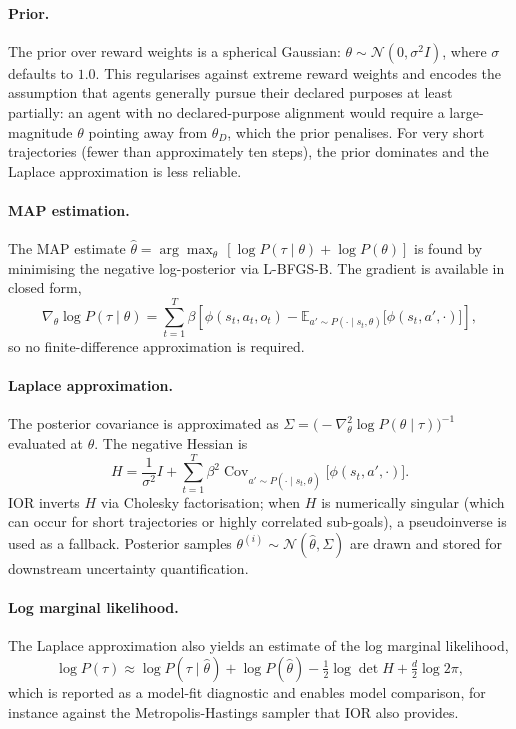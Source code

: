 \paragraph{Prior.}
The prior over reward weights is a spherical Gaussian:
$\theta \sim \mathcal{N}(0, \sigma^2 I)$, where $\sigma$ defaults to $1.0$. This
regularises against extreme reward weights and encodes the assumption that agents
generally pursue their declared purposes at least partially: an agent with no
declared-purpose alignment would require a large-magnitude $\theta$ pointing away
from $\theta_D$, which the prior penalises. For very short trajectories (fewer than
approximately ten steps), the prior dominates and the Laplace approximation is less
reliable.

\paragraph{MAP estimation.}
The MAP estimate
$\hat{\theta} = \arg\max_\theta\, [\log P(\tau \mid \theta) + \log P(\theta)]$ is
found by minimising the negative log-posterior via L-BFGS-B. The gradient is
available in closed form,
\begin{equation}
\nabla_\theta \log P(\tau \mid \theta) =
\sum_{t=1}^{T} \beta \left[\phi(s_t, a_t, o_t) -
\mathbb{E}_{a' \sim P(\cdot \mid s_t, \theta)}\big[\phi(s_t, a', \cdot)\big]\right],
\end{equation}
so no finite-difference approximation is required.

\paragraph{Laplace approximation.}
The posterior covariance is approximated as
$\Sigma = \big(-\nabla^2_\theta \log P(\theta \mid \tau)\big)^{-1}$ evaluated at
$\hat{\theta}$. The negative Hessian is
\begin{equation}
H = \frac{1}{\sigma^2} I +
\sum_{t=1}^{T} \beta^2 \operatorname{Cov}_{a' \sim P(\cdot \mid s_t, \hat{\theta})}
\big[\phi(s_t, a', \cdot)\big].
\end{equation}
IOR inverts $H$ via Cholesky factorisation; when $H$ is numerically singular
(which can occur for short trajectories or highly correlated sub-goals), a
pseudoinverse is used as a fallback. Posterior samples
$\theta^{(i)} \sim \mathcal{N}(\hat{\theta}, \Sigma)$ are drawn and stored for
downstream uncertainty quantification.

\paragraph{Log marginal likelihood.}
The Laplace approximation also yields an estimate of the log marginal likelihood,
\begin{equation}
\log P(\tau) \approx \log P(\tau \mid \hat{\theta}) + \log P(\hat{\theta})
- \tfrac{1}{2} \log \det H + \tfrac{d}{2} \log 2\pi,
\end{equation}
which is reported as a model-fit diagnostic and enables model comparison, for
instance against the Metropolis-Hastings sampler that IOR also provides.

